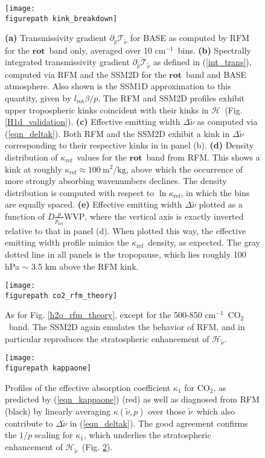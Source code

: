 \documentclass{ametsoc}
\newcommand{\eqnref}[1]{(\ref{#1})}
\newcommand{\kg}{\ensuremath{\mathrm{kg}}}
\newcommand{\meter}{\ensuremath{\mathrm{m}}}
\newcommand{\cminverse}{\ensuremath{\mathrm{cm^{-1}}}}
\newcommand{\ppp}{\ensuremath{\partial_p}}
\newcommand{\cotwo}{\ensuremath{\mathrm{CO_2}}}
\newcommand{\wv}{\ensuremath{\widetilde{\nu}}}
\newcommand{\trans}{\ensuremath{\mathcal{T}}}
\newcommand{\ch}{\ensuremath{\mathcal{H}}}
\newcommand{\chk}{\ensuremath{\ch_{\wv}}}
\newcommand{\kapparef}{\ensuremath{\kappa_{\mathrm{ref}}}}
\newcommand{\kappaone}{\ensuremath{\kappa_1}}
\newcommand{\pref}{\ensuremath{p_{\mathrm{ref}}}}
\newcommand{\WVP}{\ensuremath{\mathrm{WVP}}}
\newcommand{\lrot}{\ensuremath{l_\mathrm{rot}}}
\newcommand{\rot}{\ensuremath{\textbf{rot}}}
\newcommand{\figurepath}{./}
\begin{document}
\begin{figure}[h]
	\begin{center}
			\texttt{[image: \\figurepath kink\_breakdown]}
		\caption{\textbf{(a)} Transmissivity gradient $\ppp\trans_{\wv}$ for BASE as computed by RFM for the \rot\ band only, averaged over 10 \cminverse\  bins.
					\textbf{(b)} Spectrally integrated transmissivity gradient $\overline{\ppp\trans_{\wv}}$ as defined in \eqnref{int_trans}, computed via RFM and the SSM2D for the \rot\ band and BASE atmosphere. Also shown is the SSM1D approximation to this quantity, given by $\lrot \beta/p$. The RFM and SSM2D profiles  exhibit  upper tropospheric kinks coincident with their kinks in \ch\ (Fig. \ref{H1d_validation}). 
					\textbf{(c)} Effective emitting width $\Delta \wv$ as computed via \eqnref{eqn_deltak}. Both RFM and the SSM2D exhibit a kink in $\Delta \wv$ corresponding to their respective kinks in  in panel (b).
					\textbf{(d)} Density distribution of \kapparef\ values for the \rot\ band from RFM. This shows a kink at roughly $\kapparef \approx 100\ \meter^2/\kg$, above which the occurrence of more strongly absorbing wavenumbers declines. The density distribution is computed with respect to $\ln \kapparef$, in which the bins are equally spaced.
					\textbf{(e)} Effective emitting width $\Delta \wv$ plotted as a function of $D \frac{p}{\pref}\WVP$, where the vertical axis is exactly inverted relative to that in panel (d). When plotted this way, the effective emitting width profile mimics the \kapparef\ density, as expected.
					The gray dotted line in all panels is the tropopause, which lies roughly 100 hPa $\sim$ 3.5 km above the RFM kink. 
			\label{kink_breakdown}
		}
	\end{center}
\end{figure}

\begin{figure}[h]
	\begin{center}
			\texttt{[image: \\figurepath co2\_rfm\_theory]}
		\caption{As for Fig. \ref{h2o_rfm_theory}, except for the 500-850 \cminverse\ \cotwo\ band. The SSM2D again emulates the behavior of RFM, and in particular reproduces the stratospheric enhancement of \chk.
		\label{co2_rfm_theory}
		}
	\end{center}
\end{figure}

\begin{figure}[h]
	\begin{center}
			\texttt{[image: \\figurepath kappaone]}
		\caption{Profiles of the effective absorption coefficient $\kappaone$ for \cotwo, as predicted by \eqnref{eqn_kappaone} (red) as well as diagnosed from RFM (black) by linearly averaging $\kappa(\wv,p)$ over those \wv\ which also contribute to $\Delta \wv$ in \eqnref{eqn_deltak}. The good agreement confirms the $1/p$ scaling for \kappaone, which underlies the stratospheric enhancement of \chk\ (Fig. \ref{co2_rfm_theory}).
		\label{kappaone}
		}
	\end{center}
\end{figure}
\end{document}
